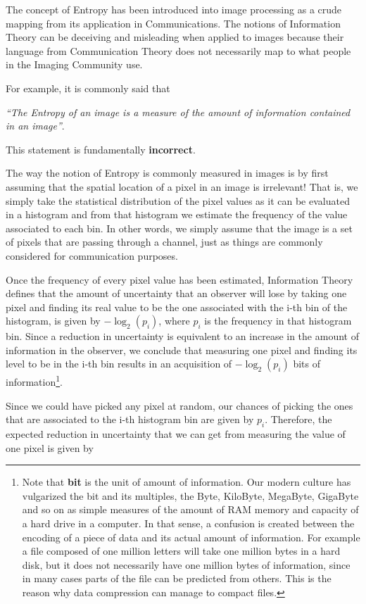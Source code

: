 The concept of Entropy has been introduced into image processing as a crude
mapping from its application in Communications. The notions of Information
Theory can be deceiving and misleading when applied to images because their
language from Communication Theory does not necessarily map to what people in
the Imaging Community use.

For example, it is commonly said that

\emph{``The Entropy of an image is a measure of the amount of information
contained in an image''}.

This statement is fundamentally \textbf{incorrect}.

The way the notion of Entropy is commonly measured in images is by first
assuming that the spatial location of a pixel in an image is irrelevant!  That
is, we simply take the statistical distribution of the pixel values as it can
be evaluated in a histogram and from that histogram we estimate the frequency
of the value associated to each bin. In other words, we simply assume that the
image is a set of pixels that are passing through a channel, just as things are
commonly considered for communication purposes.

Once the frequency of every pixel value has been estimated, Information Theory
defines that the amount of uncertainty that an observer will lose by taking one
pixel and finding its real value to be the one associated with the i-th bin of the
histogram, is given by $-\log_2{(p_i)}$, where $p_i$ is the frequency in that
histogram bin. Since a reduction in uncertainty is equivalent to an increase in
the amount of information in the observer, we conclude that measuring one pixel
and finding its level to be in the i-th bin results in an acquisition of
$-\log_2{(p_i)}$ bits of information\footnote{Note that \textbf{bit} is the unit of
amount of information. Our modern culture has vulgarized the bit and its
multiples, the Byte, KiloByte, MegaByte, GigaByte and so on as simple measures
of the amount of RAM memory and capacity of a hard drive in a computer. In that
sense, a confusion is created between the encoding of a piece of data and its
actual amount of information. For example a file composed of one million
letters will take one million bytes in a hard disk, but it does not necessarily
have one million bytes of information, since in many cases parts of the file can
be predicted from others. This is the reason why data compression can manage to
compact files.}.

Since we could have picked any pixel at random, our chances of picking the ones
that are associated to the i-th histogram bin are given by $p_i$. Therefore,
the expected reduction in uncertainty that we can get from measuring the value
of one pixel is given by


